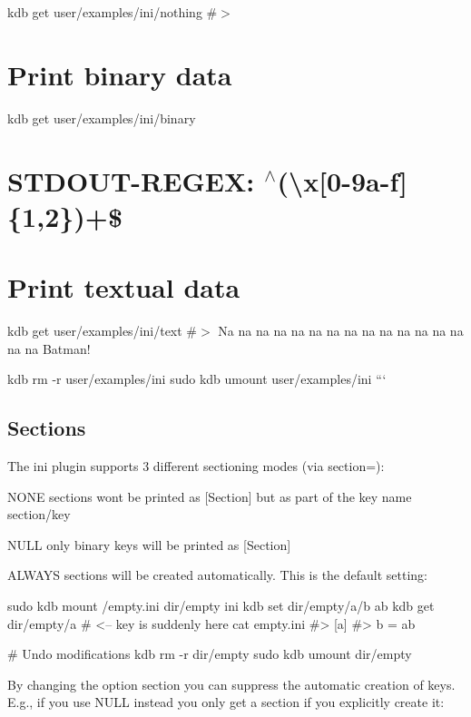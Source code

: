 kdb get user/examples/ini/nothing \#$>$

\section*{Print binary data}

kdb get user/examples/ini/binary \section*{S\+T\+D\+O\+U\+T-\/\+R\+E\+G\+EX\+: $^\wedge$(\textbackslash{}x\mbox{[}0-\/9a-\/f\mbox{]}\{1,2\})+\$}

\section*{Print textual data}

kdb get user/examples/ini/text \#$>$ Na na na na na na na na na na na na na na na na Batman!

kdb rm -\/r user/examples/ini sudo kdb umount user/examples/ini ```

\subsection*{Sections}

The ini plugin supports 3 different sectioning modes (via {\ttfamily section=})\+:


\begin{DoxyItemize}
\item {\ttfamily N\+O\+NE} sections wont be printed as {\ttfamily \mbox{[}Section\mbox{]}} but as part of the key name {\ttfamily section/key}
\item {\ttfamily N\+U\+LL} only binary keys will be printed as {\ttfamily \mbox{[}Section\mbox{]}}
\item {\ttfamily A\+L\+W\+A\+YS} sections will be created automatically. This is the default setting\+:
\end{DoxyItemize}


\begin{DoxyCode}
sudo kdb mount /empty.ini dir/empty ini
kdb set dir/empty/a/b ab
kdb get dir/empty/a       # <-- key is suddenly here
cat empty.ini
#> [a]
#> b = ab

# Undo modifications
kdb rm -r dir/empty
sudo kdb umount dir/empty
\end{DoxyCode}


By changing the option {\ttfamily section} you can suppress the automatic creation of keys. E.\+g., if you use {\ttfamily N\+U\+LL} instead you only get a section if you explicitly create it\+:


